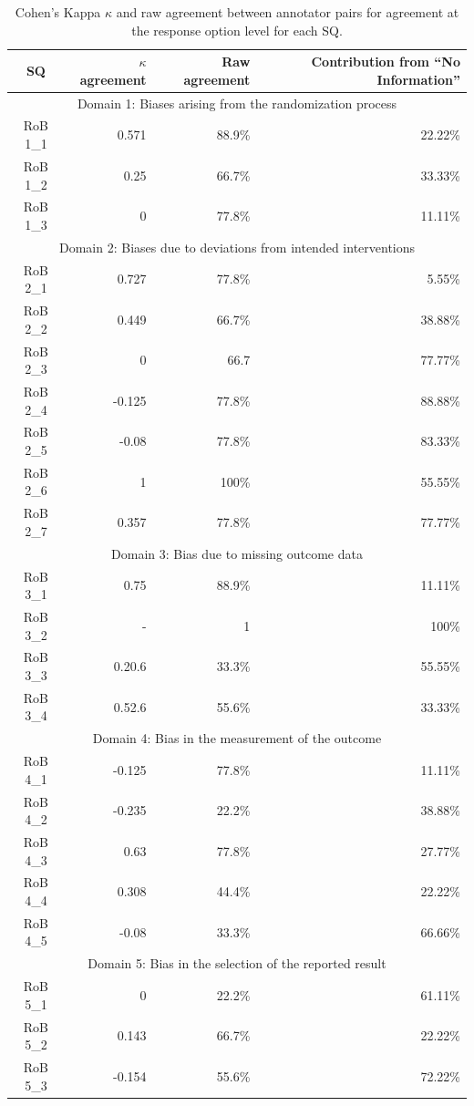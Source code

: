 \documentclass[sn-mathphys,Numbered]{sn-jnl}%
\theoremstyle{thmstyleone}%
\theoremstyle{thmstyletwo}%
\theoremstyle{thmstylethree}%
\begin{document}
%
%
%
\begin{table}[]
    \caption{Cohen's Kappa $\kappa$ and raw agreement between annotator pairs for agreement at the response option level for each SQ.}
    \label{tab:IAA_response}
    \begin{tabular}{crrr}
    \toprule[1.0pt]
        SQ & $\kappa$ agreement & Raw agreement & Contribution from ``No Information'' \\
    \midrule[1.0pt]
        \multicolumn{4}{c}{Domain 1: Biases arising from the randomization process} \\
        \hline
        RoB 1\_1 & 0.571 & 88.9\%  & 22.22\% \\
        RoB 1\_2 & 0.25 & 66.7\%  & 33.33\% \\
        RoB 1\_3 & 0 & 77.8\%  & 11.11\% \\
        \hline 
        \multicolumn{4}{c}{Domain 2: Biases due to deviations from intended interventions} \\
        \hline
        RoB 2\_1 & 0.727 & 77.8\%  & 5.55\% \\
        RoB 2\_2 & 0.449 & 66.7\%  & 38.88\% \\
        RoB 2\_3 & 0 & 66.7 & 77.77\% \\
        RoB 2\_4 & -0.125 & 77.8\%  & 88.88\% \\
        RoB 2\_5 & -0.08 & 77.8\%  & 83.33\% \\
        RoB 2\_6 & 1 & 100\%  & 55.55\% \\
        RoB 2\_7 & 0.357 & 77.8\%  & 77.77\% \\
        \hline
        \multicolumn{4}{c}{Domain 3: Bias due to missing outcome data} \\
        \hline
        RoB 3\_1 & 0.75 & 88.9\%  & 11.11\% \\
        RoB 3\_2 & - & 1 & 100\% \\
        RoB 3\_3 & 0.20.6 & 33.3\%  & 55.55\% \\
        RoB 3\_4 & 0.52.6 & 55.6\%  & 33.33\% \\
        \hline
        \multicolumn{4}{c}{Domain 4: Bias in the measurement of the outcome} \\
        \hline
        RoB 4\_1 & -0.125 & 77.8\%  & 11.11\% \\
        RoB 4\_2 & -0.235 & 22.2\%  & 38.88\% \\
        RoB 4\_3 & 0.63 & 77.8\%  & 27.77\% \\
        RoB 4\_4 & 0.308 & 44.4\%  & 22.22\% \\
        RoB 4\_5 & -0.08 & 33.3\%  & 66.66\% \\
        \hline
        \multicolumn{4}{c}{Domain 5: Bias in the selection of the reported result} \\
        \hline
        RoB 5\_1 & 0 & 22.2\%  & 61.11\% \\
        RoB 5\_2 & 0.143 & 66.7\%  & 22.22\% \\
        RoB 5\_3 & -0.154 & 55.6\%  & 72.22\% \\
    \bottomrule[1.0pt]
    \end{tabular}
\end{table}
\end{document}
